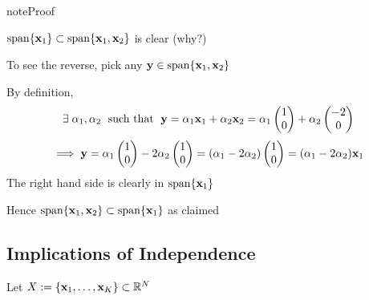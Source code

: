 \documentclass[letterpaper,10pt,english]{jupyterBook}
\begin{document}
\begin{sphinxadmonition}{note}{Proof}

\sphinxAtStartPar
\(\mathrm{span} \{{\bf x}_1\} \subset \mathrm{span}\{{\bf x}_1, {\bf x}_2\}\) is clear (why?)

\sphinxAtStartPar
To see the reverse, pick any \({\bf y} \in \mathrm{span} \{{\bf x}_1, {\bf x}_2\}\)

\sphinxAtStartPar
By definition,
\begin{equation*}
\begin{split}
%
\exists \;
\alpha_1,\alpha_2 \; \text{ such that } \;
{\bf y} 
= \alpha_1 {\bf x}_1 + \alpha_2 {\bf x}_2
=
\alpha_1 
\begin{pmatrix}
1 \\
0
\end{pmatrix}
+ \alpha_2 
\begin{pmatrix}
-2 \\
0
\end{pmatrix}
%
\end{split}
\end{equation*}\begin{equation*}
\begin{split}
%
\implies
{\bf y} 
= \alpha_1 
\begin{pmatrix}
1 \\
0
\end{pmatrix}
- 2 \alpha_2 
\begin{pmatrix}
1 \\
0
\end{pmatrix}
= (\alpha_1 - 2 \alpha_2)
\begin{pmatrix}
1 \\
0
\end{pmatrix}
= (\alpha_1 -2 \alpha_2 ) {\bf x}_1 
%
\end{split}
\end{equation*}
\sphinxAtStartPar
The right hand side is clearly in \(\mathrm{span} \{{\bf x}_1\}\)

\sphinxAtStartPar
Hence \(\mathrm{span} \{{\bf x}_1, {\bf x}_2\} \subset \mathrm{span} \{{\bf x}_1\}\) as claimed
\end{sphinxadmonition}


\subsection{Implications of Independence}
\label{\detokenize{05.linear_algebra:implications-of-independence}}
\sphinxAtStartPar
Let \(X := \{{\bf x}_1,\ldots, {\bf x}_K\} \subset \mathbb{R}^N\)
\end{document}
